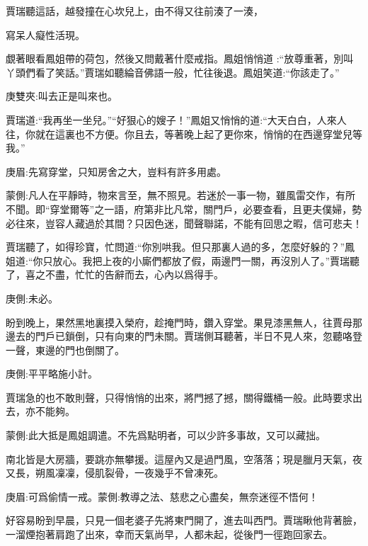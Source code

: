 \begin{parag}
    賈瑞聽這話，越發撞在心坎兒上，由不得又往前湊了一湊，\begin{note}寫呆人癡性活現。\end{note}覷著眼看鳳姐帶的荷包，然後又問戴著什麼戒指。鳳姐悄悄道 :“放尊重著，別叫丫頭們看了笑話。”賈瑞如聽綸音佛語一般，忙往後退。鳳姐笑道:“你該走了。”\begin{note}庚雙夾:叫去正是叫來也。\end{note}賈瑞道:“我再坐一坐兒。”“好狠心的嫂子！”鳳姐又悄悄的道:“大天白白，人來人往，你就在這裏也不方便。你且去，等著晚上起了更你來，悄悄的在西邊穿堂兒等我。”\begin{note}庚眉:先寫穿堂，只知房舍之大，豈料有許多用處。\end{note}\begin{note}蒙側:凡人在平靜時，物來言至，無不照見。若迷於一事一物，雖風雷交作，有所不聞。即“穿堂爾等”之一語，府第非比凡常，關門戶，必要查看，且更夫僕婦，勢必往來，豈容人藏過於其間？只因色迷，聞聲聯諾，不能有回思之暇，信可悲夫！\end{note}賈瑞聽了，如得珍寶，忙問道:“你別哄我。但只那裏人過的多，怎麼好躲的？”鳳姐道:“你只放心。我把上夜的小廝們都放了假，兩邊門一關，再沒別人了。”賈瑞聽了，喜之不盡，忙忙的告辭而去，心內以爲得手。\begin{note}庚側:未必。\end{note}
\end{parag}


\begin{parag}
    盼到晚上，果然黑地裏摸入榮府，趁掩門時，鑽入穿堂。果見漆黑無人，往賈母那邊去的門戶已鎖倒，只有向東的門未關。賈瑞側耳聽著，半日不見人來，忽聽咯登一聲，東邊的門也倒關了。\begin{note}庚側:平平略施小計。\end{note}賈瑞急的也不敢則聲，只得悄悄的出來，將門撼了撼，關得鐵桶一般。此時要求出去，亦不能夠。\begin{note}蒙側:此大抵是鳳姐調遣。不先爲點明者，可以少許多事故，又可以藏拙。\end{note}南北皆是大房牆，要跳亦無攀援。這屋內又是過門風，空落落；現是臘月天氣，夜又長，朔風凜凜，侵肌裂骨，一夜幾乎不曾凍死。\begin{note}庚眉:可爲偷情一戒。蒙側:教導之法、慈悲之心盡矣，無奈迷徑不悟何！\end{note}好容易盼到早晨，只見一個老婆子先將東門開了，進去叫西門。賈瑞瞅他背著臉，一溜煙抱著肩跑了出來，幸而天氣尚早，人都未起，從後門一徑跑回家去。
\end{parag}


